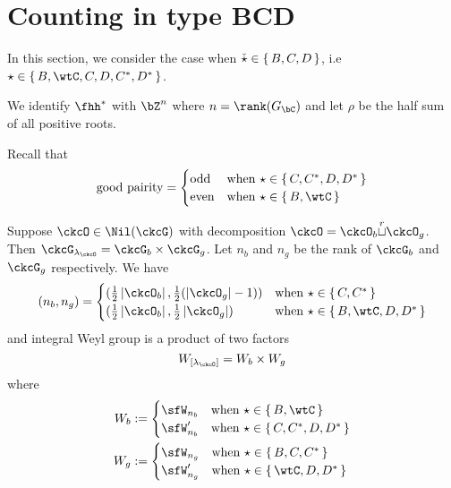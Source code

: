 \documentclass[12pt,a4paper]{amsart}
\def\abs#1{\left|{#1}\right|}
\newcommand{\sgn}{\operatorname{sgn}}
\numberwithin{equation}{section}
\theoremstyle{remark}
\def\half{{\tfrac{1}{2}}}
\def\lamck{\lambda_\ckcO}
\def\Gc{G_\bC}
\def\cuprow{{\stackrel{r}{\sqcup}}}
\begin{document}
\section{Counting in type BCD}
\def\tsgn{\widetilde{\sgn}}
\def\PBP{\mathsf{PBP}}

\def\ckstar{{\check \star}}

In this section, we consider the case when $\ckstar \in \set{B,C,D}$, i.e
$\star \in \set{B,\wtC, C,D,C^{*}, D^{*}}$.

We identify $\fhh^{*}$ with $\bZ^{n}$ where $n = \rank(\Gc)$
and let $\rho$ be the half sum of all positive roots.

Recall that
\[
  \text{good pairity} =
\begin{cases}
 \text{odd} & \text{when } \star \in \set{C,C^{*},D,D^{*}}\\
 \text{even} & \text{when } \star \in \set{B,\wtC}\\
\end{cases}
\]

\def\Wb{W_{b}}
\def\Wg{W_{g}}

  Suppose $\ckcO\in \Nil(\ckcG)$ with decomposition
  $\ckcO = \ckcO_{b}\cuprow \ckcO_{g}$.
  Then $\ckcG_{\lamck} = \ckcG_{b}\times \ckcG_{g}$.
  Let $n_{b}$ and $n_{g}$ be the rank of $\ckcG_{b}$ and $\ckcG_{g}$
  respectively. We have
  \[
    (n_{b}, n_{g}) =
    \begin{cases}
      (\half \abs{\ckcO_{b}}, \half(\abs{\ckcO_{g}}-1)) & \text{when
      } \star \in \set{C,C^{*}}\\
      (\half \abs{\ckcO_{b}}, \half\abs{\ckcO_{g}}) & \text{when
      } \star \in \set{B,\wtC,D,D^{*}}\\
    \end{cases}
  \]
  and integral Weyl group is a product of two factors
  \[
    W_{[\lamck]} =\Wb\times \Wg
  \]
  where
  \[
    \begin{split}
    \Wb & := \begin{cases}
      \sfW_{n_{b}}  & \text{when } \star \in \set{B, \wtC} \\
      \sfW'_{n_{b}} & \text{when } \star \in \set{C,C^{*},D,D^{*}}
      \end{cases}\\
    \Wg & := \begin{cases}
      \sfW_{n_{g}}  & \text{when } \star \in \set{B,C, C^{*} } \\
      \sfW'_{n_{g}} & \text{when } \star \in \set{\wtC,D,D^{*}}
      \end{cases}
    \end{split}
  \]
\end{document}

